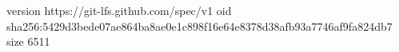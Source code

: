 version https://git-lfs.github.com/spec/v1
oid sha256:5429d3bede07ae864ba8ae0e1c898f16e64e8378d38afb93a7746af9fa824db7
size 6511
